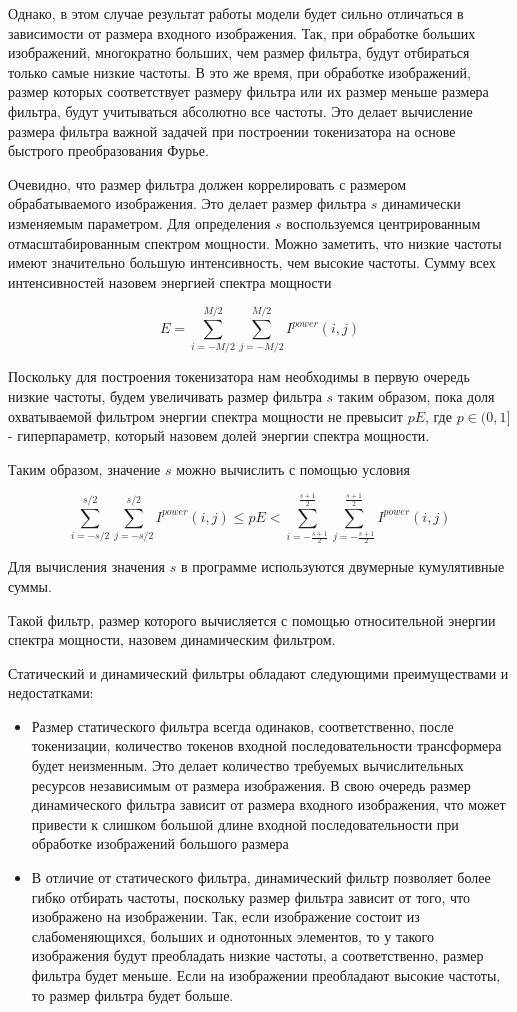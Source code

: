 \documentclass[times,specification,annotation]{itmo-student-thesis}
\begin{document}
Однако, в этом случае результат работы модели будет сильно отличаться в зависимости от размера входного изображения. Так, при обработке больших изображений, многократно больших, чем размер фильтра, будут отбираться только самые низкие частоты. В это же время, при обработке изображений, размер которых соответствует размеру фильтра или их размер меньше размера фильтра, будут учитываться абсолютно все частоты. Это делает вычисление размера фильтра важной задачей при построении токенизатора на основе быстрого преобразования Фурье.

Очевидно, что размер фильтра должен коррелировать с размером обрабатываемого изображения. Это делает размер фильтра $s$ динамически изменяемым параметром. Для определения $s$ воспользуемся центрированным отмасштабированным спектром мощности. Можно заметить, что низкие частоты имеют значительно большую интенсивность, чем высокие частоты. Сумму всех интенсивностей назовем энергией спектра мощности 

$$
E = \sum\limits_{i=-M/2}^{M/2}\sum\limits_{j=-M/2}^{M/2} I^{power}(i, j)
$$ 

Поскольку для построения токенизатора нам необходимы в первую очередь низкие частоты, будем увеличивать размер фильтра $s$ таким образом, пока доля охватываемой фильтром энергии спектра мощности не превысит $pE$, где $p \in (0, 1]$ - гиперпараметр, который назовем долей энергии спектра мощности.

Таким образом, значение $s$ можно вычислить с помощью условия

$$
\sum_{i=-s/2}^{s/2}\sum_{j=-s/2}^{s/2} I^{power}(i, j) \leq pE < \sum_{i=-\frac{s+1}{2}}^{\frac{s+1}{2}}\sum_{j=-\frac{s+1}{2}}^{\frac{s+1}{2}} I^{power}(i, j)
$$

Для вычисления значения $s$ в программе используются двумерные кумулятивные суммы.

Такой фильтр, размер которого вычисляется с помощью относительной энергии спектра мощности, назовем динамическим фильтром. 

Статический и динамический фильтры обладают следующими преимуществами и недостатками:

\begin{itemize}
    \item Размер статического фильтра всегда одинаков, соответственно, после токенизации, количество токенов входной последовательности трансформера будет неизменным. Это делает количество требуемых вычислительных ресурсов независимым от размера изображения. В свою очередь размер динамического фильтра зависит от размера входного изображения, что может привести к слишком большой длине входной последовательности при обработке изображений большого размера
    \item В отличие от статического фильтра, динамический фильтр позволяет более гибко отбирать частоты, поскольку размер фильтра зависит от того, что изображено на изображении. Так, если изображение состоит из слабоменяющихся, больших и однотонных элементов, то у такого изображения будут преобладать низкие частоты, а соответственно, размер фильтра будет меньше. Если на изображении преобладают высокие частоты, то размер фильтра будет больше.
\end{itemize}
\end{document}
